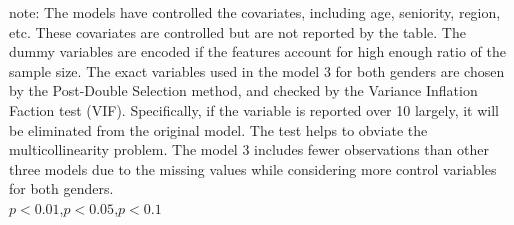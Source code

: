 \documentclass{article}
\begin{document}
\vspace{-0.1cm}
\begin{footnotesize} note: The models have controlled the covariates, including age, seniority, region, etc. These covariates are controlled but are not reported by the table. The dummy variables are encoded if the features account for high enough ratio of the sample size. The exact variables used in the model 3 for both genders are chosen by the Post-Double Selection method, and checked by the Variance Inflation Faction test (VIF). Specifically, if the variable is reported over 10 largely, it will be eliminated from the original model. The test helps to obviate the multicollinearity problem. The model 3 includes fewer observations than other three models due to the missing values while considering more control variables for both genders. \\
\textnormal{\superscript{***}}$p<0.01$,\textnormal{\superscript{**}}$p<0.05$,\textnormal{\superscript{*}}$p<0.1$\normalsize
\end{footnotesize}


\newpage
\end{document}
